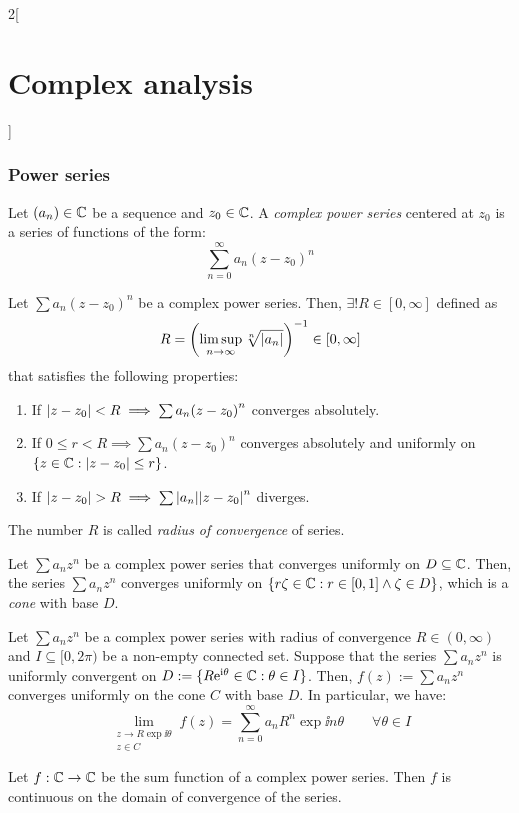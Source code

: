 \documentclass[../../../main.tex]{subfiles}
\begin{document}
\begin{multicols}{2}[\section{Complex analysis}]
  \subsubsection{Power series}
  \begin{definition}
    Let $(a_n)\in\mathbb{C}$ be a sequence and $z_0\in\mathbb{C}$. A \emph{complex power series} centered at $z_0$ is a series of functions of the form: $$\sum_{n=0}^\infty a_n{(z-z_0)}^n$$
  \end{definition}
  \begin{theorem}
    Let $\sum a_n{(z-z_0)}^n$ be a complex power series. Then, $\exists! R\in[0,\infty]$ defined as $$R=\left(\limsup_{n\to\infty}\sqrt[n]{\abs{a_n}}\right)^{-1}\in[0,\infty]$$
    that satisfies the following properties:
    \begin{enumerate}
      \item If $\abs{z-z_0}<R\implies\sum a_n{(z-z_0)}^n$ converges absolutely.
      \item If $0\leq r<R\implies\sum a_n{(z-z_0)}^n$ converges absolutely and uniformly on $\{z\in\mathbb{C}:\abs{z-z_0}\leq r\}$.
      \item If $\abs{z-z_0}>R\implies\sum\abs{a_n}{\abs{z-z_0}}^n$ diverges.
    \end{enumerate}
    The number $R$ is called \emph{radius of convergence} of series.
  \end{theorem}
  \begin{theorem}
    Let $\sum a_n{z}^n$ be a complex power series that converges uniformly on $D\subseteq \mathbb{C}$. Then, the series $\sum a_n{z}^n$ converges uniformly on $\{r\zeta\in\mathbb{C}:r\in[0,1]\land\zeta\in D\}$, which is a \emph{cone} with base $D$.
  \end{theorem}
  \begin{corollary}
    Let $\sum a_n{z}^n$ be a complex power series with radius of convergence $R\in(0,\infty)$ and $I\subseteq [0,2\pi)$ be a non-empty connected set. Suppose that the series $\sum a_n{z}^n$ is uniformly convergent on $D:=\{R\mathrm{e}^{\mathrm{i} \theta}\in\mathbb{C}: \theta\in I\}$. Then, $f(z):=\sum a_n{z}^n$ converges uniformly on the cone $C$ with base $D$. In particular, we have: $$\lim_{\substack{z\to R\exp{\ii \theta}\\z\in C}}f(z)=\sum_{n=0}^\infty a_nR^n\exp{\ii n\theta}\qquad\forall\theta\in I$$
  \end{corollary}
  \begin{proposition}
    Let $f:\mathbb{C}\rightarrow\mathbb{C}$ be the sum function of a complex power series. Then $f$ is continuous on the domain of convergence of the series.
  \end{proposition}

\end{multicols}
\end{document}
